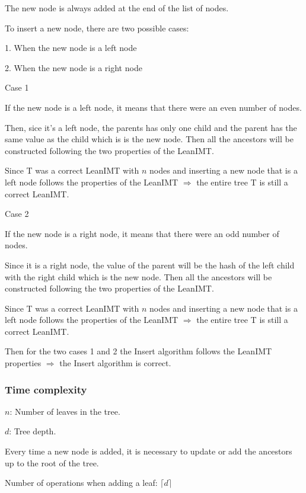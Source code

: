 \documentclass{article}
\begin{document}
The new node is always added at the end of the list of nodes.

To insert a new node, there are two possible cases:

1. When the new node is a left node

2. When the new node is a right node

Case 1

If the new node is a left node, it means that there were an even number of nodes.

Then, sice it's a left node, the parents has only one child and the parent has the same value as the child which is is the new node. Then all the ancestors will be constructed following the two properties of the LeanIMT.

Since T was a correct LeanIMT with $n$ nodes and inserting a new node that is a left node follows the properties of the LeanIMT $\Rightarrow$ the entire tree T is still a correct LeanIMT.

Case 2

If the new node is a right node, it means that there were an odd number of nodes.

Since it is a right node, the value of the parent will be the hash of the left child with the right child which is the new node. Then all the ancestors will be constructed following the two properties of the LeanIMT.

Since T was a correct LeanIMT with $n$ nodes and inserting a new node that is a left node follows the properties of the LeanIMT $\Rightarrow$ the entire tree T is still a correct LeanIMT.

Then for the two cases 1 and 2 the Insert algorithm follows the LeanIMT properties $\Rightarrow$ the Insert algorithm is correct.

\bigbreak

\subsubsection{Time complexity}

\bigbreak

$n$: Number of leaves in the tree.

$d$: Tree depth.

\bigbreak

Every time a new node is added, it is necessary to update or add the ancestors up to the root of the tree.

\bigbreak
\label{InsertProof}
Number of operations when adding a leaf: $\lceil d \rceil$
\end{document}
